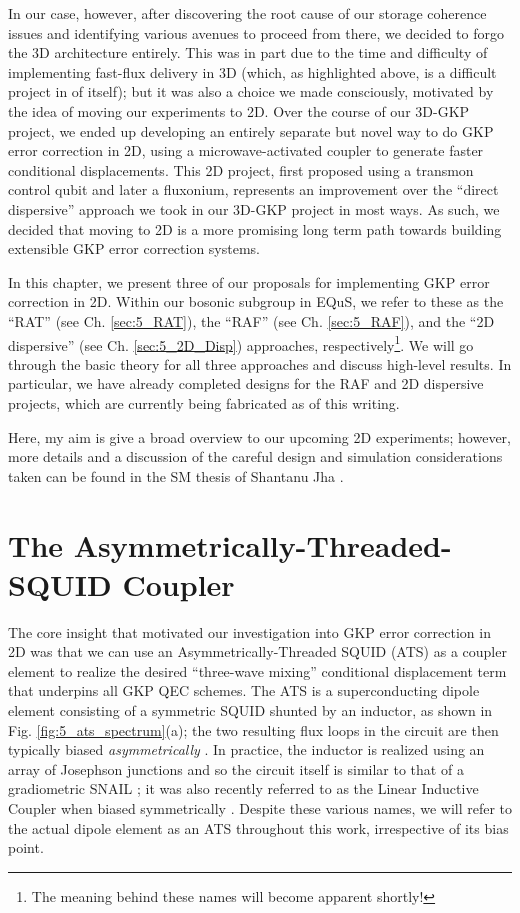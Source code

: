 In our case, however, after discovering the root cause of our storage coherence issues and identifying various avenues to proceed from there, we decided to forgo the 3D architecture entirely. This was in part due to the time and difficulty of implementing fast-flux delivery in 3D (which, as highlighted above, is a difficult project in of itself); but it was also a choice we made consciously, motivated by the idea of moving our experiments to 2D. Over the course of our 3D-GKP project, we ended up developing an entirely separate but novel way to do GKP error correction in 2D, using a microwave-activated coupler to generate faster conditional displacements. This 2D project, first proposed using a transmon control qubit and later a fluxonium, represents an improvement over the ``direct dispersive'' approach we took in our 3D-GKP project in most ways. As such, we decided that moving to 2D is a more promising long term path towards building extensible GKP error correction systems. 

In this chapter, we present three of our proposals for implementing GKP error correction in 2D. Within our bosonic subgroup in EQuS, we refer to these as the ``RAT'' (see Ch. \ref{sec:5_RAT}), the ``RAF'' (see Ch. \ref{sec:5_RAF}), and the ``2D dispersive'' (see Ch. \ref{sec:5_2D_Disp}) approaches, respectively\footnote{The meaning behind these names will become apparent shortly!}. We will go through the basic theory for all three approaches and discuss high-level results. In particular, we have already completed designs for the RAF and 2D dispersive projects, which are currently being fabricated as of this writing. 

Here, my aim is give a broad overview to our upcoming 2D experiments; however, more details and a discussion of the careful design and simulation considerations taken can be found in the SM thesis of Shantanu Jha \cite{shantanu2024thesis}. 
\clearpage


\section{The Asymmetrically-Threaded-SQUID Coupler \label{sec:5_RAT}}

The core insight that motivated our investigation into GKP error correction in 2D was that we can use an Asymmetrically-Threaded SQUID (ATS) as a coupler element to realize the desired ``three-wave mixing'' conditional displacement term that underpins all GKP QEC schemes. The ATS is a superconducting dipole element consisting of a symmetric SQUID shunted by an inductor, as shown in Fig. \ref{fig:5_ats_spectrum}(a); the two resulting flux loops in the circuit are then typically biased \textit{asymmetrically} \cite{lescanne2020exponential, berdou2023one}. In practice, the inductor is realized using an array of Josephson junctions and so the circuit itself is similar to that of a gradiometric SNAIL \cite{miano2022frequency}; it was also recently referred to as the Linear Inductive Coupler when biased symmetrically \cite{maiti2024ancilla}. Despite these various names, we will refer to the actual dipole element as an ATS throughout this work, irrespective of its bias point. 

